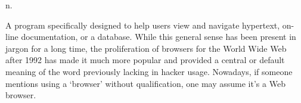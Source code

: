  n.

A program specifically designed to help users view and navigate hypertext,
on-line documentation, or a database. While this general sense has been present
in jargon for a long time, the proliferation of browsers for the World Wide Web
after 1992 has made it much more popular and provided a central or default
meaning of the word previously lacking in hacker usage. Nowadays, if someone
mentions using a `browser' without qualification, one may assume it's a Web
browser.

